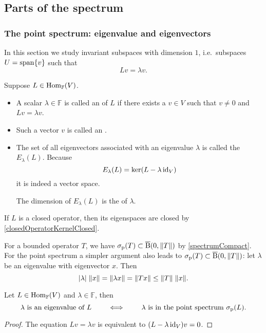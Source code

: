 \subsection{Parts of the spectrum}

\subsubsection{The point spectrum: eigenvalue and eigenvectors}
In this section we study invariant subspaces with dimension $1$, i.e.\ subspaces $U= \operatorname{span}\{v\}$ such that
\[ Lv = \lambda v. \]
\begin{definition}
Suppose $L\in \operatorname{Hom}_{\mathbb{F}}(V)$.
\begin{itemize}
\item  A scalar $\lambda\in \mathbb{F}$ is called an  of $L$ if there exists a $v\in V$ such that $v\neq 0$ and $Lv = \lambda v$.
\item Such a vector $v$ is called an .
\item The set of all eigenvectors associated with an eigenvalue $\lambda$ is called the  $E_\lambda(L)$. Because
\[ E_\lambda(L) = \ker(L-\lambda \operatorname{id}_V) \]
it is indeed a vector space.

The dimension of $E_\lambda(L)$ is the  of $\lambda$.
\end{itemize}
\end{definition}
If $L$ is a closed operator, then its eigenspaces are closed by \ref{closedOperatorKernelClosed}.

For a bounded operator $T$, we have $\sigma_\text{p}(T)\subset \operatorname{\overline{B}}(0, \lVert T\rVert)$ by \ref{spectrumCompact}. For the point spectrum a simpler argument also leads to $\sigma_\text{p}(T)\subset \operatorname{\overline{B}}(0, \lVert T\rVert)$: let $\lambda$ be an eigenvalue with eigenvector $x$. Then
\[ |\lambda|\;\lVert x\rVert = \lVert\lambda x\rVert = \lVert Tx\rVert \leq \lVert T\rVert\;\lVert x\rVert. \]

\begin{proposition}
Let $L\in \operatorname{Hom}_\mathbb{F}(V)$ and $\lambda\in \mathbb{F}$, then
\[ \text{$\lambda$ is an eigenvalue of $L$} \qquad \iff \qquad \text{$\lambda$ is in the point spectrum $\sigma_\text{p}(L)$.} \]
\end{proposition}
\begin{proof}
The equation $Lv = \lambda v$ is equivalent to $(L-\lambda \operatorname{id}_V)v = 0$.
\end{proof}

